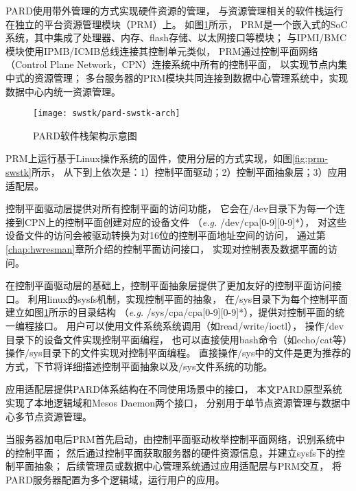 PARD使用带外管理的方式实现硬件资源的管理，
与资源管理相关的软件栈运行在独立的平台资源管理模块（PRM）上。
如图\ref{fig:pard-swstk-arch}所示，
PRM是一个嵌入式的SoC系统，其中集成了处理器、内存、flash存储、以太网接口等模块；
与IPMI/BMC模块使用IPMB/ICMB总线连接其控制单元类似，
PRM通过控制平面网络（Control Plane Network，CPN）连接系统中所有的控制平面，
以实现节点内集中式的资源管理；
多台服务器的PRM模块共同连接到数据中心管理系统中，实现数据中心内统一资源管理。

\begin{figure}[tb]
  \centering
  \texttt{[image: swstk/pard-swstk-arch]}
  \caption{PARD软件栈架构示意图}
  \label{fig:pard-swstk-arch}
\end{figure}


PRM上运行基于Linux操作系统的固件，使用分层的方式实现，如图\ref{fig:prm-swstk}所示，
从下到上依次是：1）控制平面驱动；2）控制平面抽象层；3）应用适配层。

控制平面驱动层提供对所有控制平面的访问功能，
它会在/dev目录下为每一个连接到CPN上的控制平面创建对应的设备文件
（\textit{e.g.} /dev/cpa[0-9][0-9]*），
对这些设备文件的访问会被驱动转换为对16位的控制平面地址空间的访问，
通过第\ref{chap:hwresman}章所介绍的控制平面访问接口，
实现对控制表及数据平面的访问。

在控制平面驱动层的基础上，控制平面抽象层提供了更加友好的控制平面访问接口。
利用linux的sysfs\cite{patrick_mochel_sysfs_2005}机制，实现控制平面的抽象，
在/sys目录下为每个控制平面建立如图\ref{fig:pard-swstk-arch}所示的目录结构
（\textit{e.g.} /sys/cpa/cpa[0-9][0-9]*），提供对控制平面的统一编程接口。
用户可以使用文件系统系统调用（如read/write/ioctl），
操作/dev目录下的设备文件实现控制平面编程，
也可以直接使用bash命令（如echo/cat等）操作/sys目录下的文件实现对控制平面编程。
直接操作/sys中的文件是更为推荐的方式，下节将详细描述控制平面抽象以及/sys文件系统的功能。

应用适配层提供PARD体系结构在不同使用场景中的接口，
本文PARD原型系统实现了本地逻辑域和Mesos Daemon两个接口，
分别用于单节点资源管理与数据中心多节点资源管理。

当服务器加电后PRM首先启动，由控制平面驱动枚举控制平面网络，识别系统中的控制平面；
然后通过控制平面获取服务器的硬件资源信息，并建立sysfs下的控制平面抽象；
后续管理员或数据中心管理系统通过应用适配层与PRM交互，
将PARD服务器配置为多个逻辑域，运行用户的应用。


